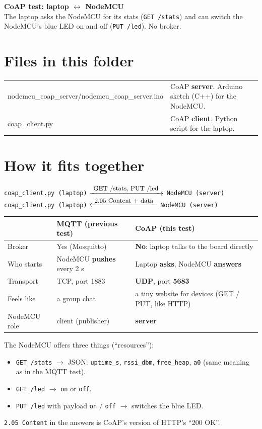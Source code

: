 \documentclass[11pt]{article}
\begin{document}
{\LARGE\bfseries CoAP test: laptop $\leftrightarrow$ NodeMCU}\\[4pt]
The laptop asks the NodeMCU for its stats (\texttt{GET /stats}) and can switch the NodeMCU's blue LED on and off (\texttt{PUT /led}). No broker.

\section*{Files in this folder}
\begin{tabular}{@{}>{\ttfamily}l l@{}}
nodemcu\_coap\_server/nodemcu\_coap\_server.ino & CoAP \textbf{server}. Arduino sketch (C++) for the NodeMCU. \\
coap\_client.py & CoAP \textbf{client}. Python script for the laptop. \\
\end{tabular}

\section*{How it fits together}
\begin{center}
\texttt{coap\_client.py (laptop)} $\xrightarrow{\ \mbox{\small GET /stats, PUT /led}\ }$ \texttt{NodeMCU (server)}\\[2pt]
\texttt{coap\_client.py (laptop)} $\xleftarrow{\ \mbox{\small 2.05 Content + data}\ }$ \texttt{NodeMCU (server)}
\end{center}

\begin{tabular}{@{}>{\raggedright}p{3.4cm} >{\raggedright}p{6.2cm} >{\raggedright\arraybackslash}p{6.6cm}@{}}
\toprule
 & \textbf{MQTT} (previous test) & \textbf{CoAP} (this test) \\
\midrule
Broker & Yes (Mosquitto) & \textbf{No}: laptop talks to the board directly \\
Who starts & NodeMCU \textbf{pushes} every 2 s & Laptop \textbf{asks}, NodeMCU \textbf{answers} \\
Transport & TCP, port 1883 & \textbf{UDP}, port \textbf{5683} \\
Feels like & a group chat & a tiny website for devices (GET / PUT, like HTTP) \\
NodeMCU role & client (publisher) & \textbf{server} \\
\bottomrule
\end{tabular}

\vspace{6pt}
The NodeMCU offers three things (``resources''):
\begin{itemize}
\item \texttt{GET /stats} $\rightarrow$ JSON: \texttt{uptime\_s}, \texttt{rssi\_dbm}, \texttt{free\_heap}, \texttt{a0} (same meaning as in the MQTT test).
\item \texttt{GET /led} $\rightarrow$ \texttt{on} or \texttt{off}.
\item \texttt{PUT /led} with payload \texttt{on} / \texttt{off} $\rightarrow$ switches the blue LED.
\end{itemize}
\texttt{2.05 Content} in the answers is CoAP's version of HTTP's ``200 OK''.
\end{document}
